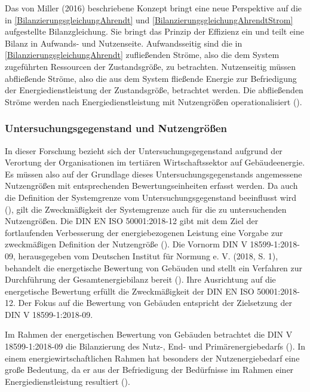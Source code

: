 Das von Miller (2016) beschriebene Konzept bringt eine neue Perspektive auf die in \eqref{BilanzierungsgleichungAhrendt} und \eqref{BilanzierungsgleichungAhrendtStrom} 
aufgestellte Bilanzgleichung. Sie bringt das Prinzip der Effizienz ein und teilt eine Bilanz in Aufwands- und Nutzenseite.
Aufwandsseitig sind die in \eqref{BilanzierungsgleichungAhrendt} zufließenden Ströme, also die dem System zugeführten Ressourcen der Zustandsgröße, zu betrachten.
Nutzenseitig müssen abfließende Ströme, also die aus dem System fließende Energie zur Befriedigung der Energiedienstleistung der Zustandsgröße, betrachtet werden.
Die abfließenden Ströme werden nach Energiedienstleistung mit Nutzengrößen operationalisiert (\cite{Miller.2016}).


\subsubsection{Untersuchungsgegenstand und Nutzengrößen}

In dieser Forschung bezieht sich der Untersuchungsgegenstand aufgrund der Verortung der Organisationen im tertiären Wirtschaftssektor auf Gebäudeenergie. 
Es müssen also auf der Grundlage dieses Untersuchungsgegenstands angemessene Nutzengrößen mit entsprechenden Bewertungseinheiten erfasst werden.
Da auch die Definition der Systemgrenze vom Untersuchungsgegenstand beeinflusst wird (\cite[S. 109]{Miller.2016}), gilt die Zweckmäßigkeit der Systemgrenze auch für die 
zu untersuchenden Nutzengrößen.
Die DIN EN ISO 50001:2018-12 gibt mit dem Ziel der fortlaufenden Verbesserung der energiebezogenen Leistung eine Vorgabe zur zweckmäßigen Definition der Nutzengröße 
(\cite[S. 11]{DIN50001.2018}).
Die Vornorm DIN V 18599-1:2018-09, herausgegeben vom Deutschen Institut für Normung e. V. (2018, S. 1), behandelt die energetische Bewertung von Gebäuden und stellt ein 
Verfahren zur Durchführung der Gesamtenergiebilanz bereit (\cite[S. 9]{DIN18599.2018}). Ihre Ausrichtung auf die energetische Bewertung erfüllt die Zweckmäßigkeit der 
DIN EN ISO 50001:2018-12. Der Fokus auf die Bewertung von Gebäuden entspricht der Zielsetzung der DIN V 18599-1:2018-09.

Im Rahmen der energetischen Bewertung von Gebäuden betrachtet die DIN V 18599-1:2018-09 die Bilanzierung des Nutz-, End- und Primärenergiebedarfs (\cite{DIN18599.2018}).
In einem energiewirtschaftlichen Rahmen hat besonders der Nutzenergiebedarf eine große Bedeutung, da er aus der Befriedigung der Bedürfnisse im Rahmen einer 
Energiedienstleistung resultiert (\cite[S. 107]{Miller.2016}).

